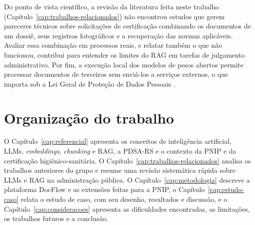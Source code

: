 Do ponto de vista científico, a revisão da literatura feita neste trabalho (Capítulo~\ref{cap:trabalhos-relacionados}) não encontrou estudos que gerem pareceres técnicos sobre solicitações de certificação combinando os documentos de um dossiê, seus registros fotográficos e a recuperação das normas aplicáveis. Avaliar essa combinação em processos reais, e relatar também o que não funcionou, contribui para entender os limites do RAG em tarefas de julgamento administrativo. Por fim, a execução local dos modelos de pesos abertos permite processar documentos de terceiros sem enviá-los a serviços externos, o que importa sob a Lei Geral de Proteção de Dados Pessoais \cite{Brasil2018}.

\section{Organização do trabalho}
\label{sec:organizacao}

O Capítulo~\ref{cap:referencial} apresenta os conceitos de inteligência artificial, LLMs, \textit{embeddings}, \textit{chunking} e RAG, a PDSA-RS e o contexto da PNIP e da certificação higiênico-sanitária.
O Capítulo~\ref{cap:trabalhos-relacionados} analisa os trabalhos anteriores do grupo e resume uma revisão sistemática rápida sobre LLMs e RAG na administração pública.
O Capítulo~\ref{cap:metodologia} descreve a plataforma DocFlow e as extensões feitas para a PNIP, o Capítulo~\ref{cap:estudo-caso} relata o estudo de caso, com seu desenho, resultados e discussão, e o Capítulo~\ref{cap:consideracoes} apresenta as dificuldades encontradas, as limitações, os trabalhos futuros e a conclusão.

